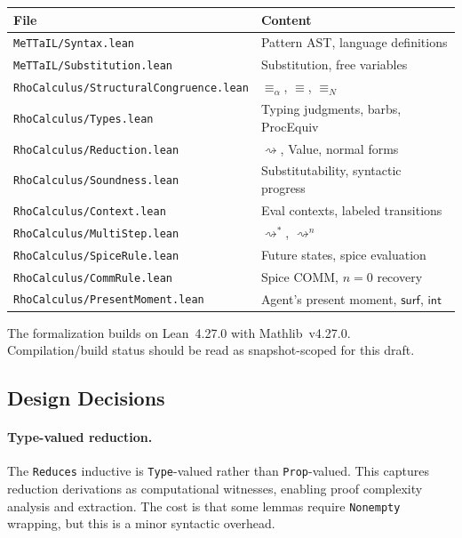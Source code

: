 \documentclass[11pt,a4paper]{article}
\theoremstyle{definition}
\theoremstyle{remark}
\newcommand{\reduces}{\rightsquigarrow}
\newcommand{\reducesN}[1]{\rightsquigarrow^{#1}}
\newcommand{\reducesStar}{\rightsquigarrow^{*}}
\newcommand{\SC}{\equiv}
\newcommand{\alphaEq}{\equiv_\alpha}
\newcommand{\nameEq}{\equiv_N}
\newcommand{\surf}{\mathsf{surf}}
\newcommand{\internalC}{\mathsf{int}}
\newcommand{\lean}[1]{\lstinline[language=Lean4]{#1}}
\begin{document}
\smallskip
\begin{center}
\begin{tabular}{ll}
  \hline
  \textbf{File} & \textbf{Content} \\
  \hline
  \texttt{MeTTaIL/Syntax.lean} & Pattern AST, language definitions \\
  \texttt{MeTTaIL/Substitution.lean} & Substitution, free variables \\
  \texttt{RhoCalculus/StructuralCongruence.lean} & $\alphaEq$, $\SC$, $\nameEq$ \\
  \texttt{RhoCalculus/Types.lean} & Typing judgments, barbs, ProcEquiv \\
  \texttt{RhoCalculus/Reduction.lean} & $\reduces$, Value, normal forms \\
  \texttt{RhoCalculus/Soundness.lean} & Substitutability, syntactic progress \\
  \texttt{RhoCalculus/Context.lean} & Eval contexts, labeled transitions \\
  \texttt{RhoCalculus/MultiStep.lean} & $\reducesStar$, $\reducesN{n}$ \\
  \texttt{RhoCalculus/SpiceRule.lean} & Future states, spice evaluation \\
  \texttt{RhoCalculus/CommRule.lean} & Spice COMM, $n=0$ recovery \\
  \texttt{RhoCalculus/PresentMoment.lean} & Agent's present moment, $\surf$, $\internalC$ \\
  \hline
\end{tabular}
\end{center}

\smallskip
The formalization builds on Lean~4.27.0 with Mathlib~v4.27.0.
Compilation/build status should be read as snapshot-scoped for this draft.

\subsection{Design Decisions}

\paragraph{Type-valued reduction.}
The \lean{Reduces} inductive is \lean{Type}-valued rather than \lean{Prop}-valued.
This captures reduction derivations as computational witnesses, enabling
proof complexity analysis and extraction. The cost is that some lemmas require
\lean{Nonempty} wrapping, but this is a minor syntactic overhead.
\end{document}

